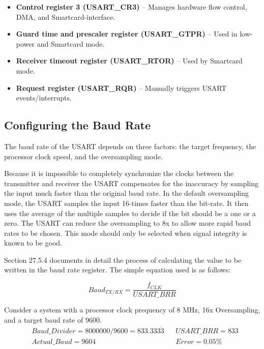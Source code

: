 \documentclass[openany,11pt,fleqn]{book} %
\begin{document}
\begin{itemize}
    \item \textbf{Control register 3 (USART\_CR3)} -- Manages hardware flow control, DMA, and Smartcard-interface. 
    \item \textbf{Guard time and prescaler register (USART\_GTPR)} -- Used in low-power and Smartcard mode. 
    \item \textbf{Receiver timeout register (USART\_RTOR)} -- Used by Smartcard mode. 
    \item \textbf{Request register (USART\_RQR)} -- Manually triggers USART events/interrupts. 
\end{itemize}

\subsection{Configuring the Baud Rate}	
The baud rate of the USART depends on three factors: the target frequency, the processor clock speed, and the oversampling mode.

Because it is impossible to completely synchronize the clocks between the transmitter and receiver the USART compensates for the inaccuracy by sampling the input much faster than the original baud rate. In the default oversampling mode, the USART samples the input 16-times faster than the bit-rate. It then uses the average of the multiple samples to decide if the bit should be a one or a zero. The USART can reduce the oversampling to 8x to allow more rapid baud rates to be chosen. This mode should only be selected when signal integrity is known to be good.

Section 27.5.4 documents in detail the process of calculating the value to be written in the baud rate register. The simple equation used is as follows:

\begin{equation*}
Baud_{TX/RX} = \frac{f_{CLK}}{USART\_BRR}
\end{equation*}



\begin{example}
    Consider a system with a processor clock prequency of 8 MHz, 16x Oversampling, and a target baud rate of 9600.  
    \begin{align*}
    & Baud\_Divider = 8000000/9600 = 833.33\overline{33} & & USART\_BRR = 833\\[0.25em]
    & Actual\_Baud = 9604 & & Error = 0.05 \%
    \end{align*}
    
\end{example}
    
\end{document}
